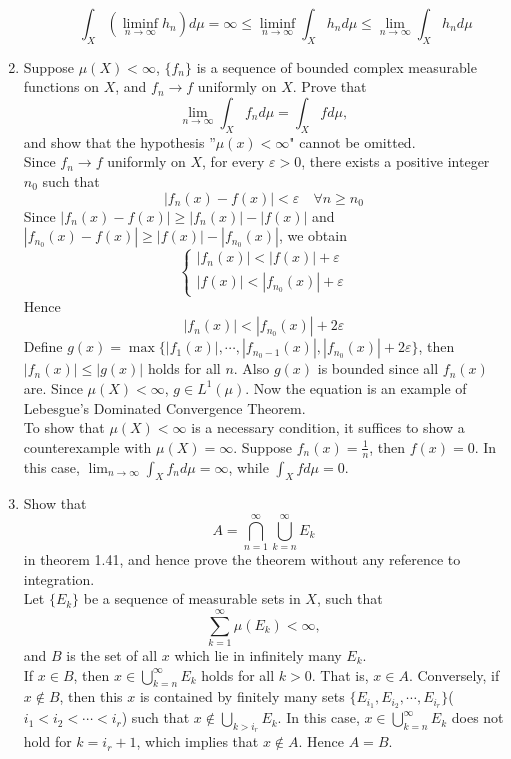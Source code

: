\documentclass{article}
\begin{document}
\begin{enumerate}
\begin{enumerate}
 			\[
 				\int_{X}\left(\liminf_{n\to\infty}h_n\right)d\mu=\infty\leq\liminf_{n\to\infty}\int_{X}h_nd\mu\leq\lim_{n\to\infty}\int_{X}h_nd\mu
 			\]
 	\end{enumerate}
 	\item \exercise Suppose $\mu(X)<\infty$, $\{f_n\}$ is a sequence of bounded complex measurable functions on $X$, and $f_n\to f$ uniformly on $X$. Prove that
 	\[
 		\lim_{n\to\infty}\int_{X}f_nd\mu=\int_{X}fd\mu,
 	\]
 	and show that the hypothesis ''$\mu(x)<\infty$" cannot be omitted.\\
 	\solution
 	Since $f_n\to f$ uniformly on $X$, for every $\varepsilon>0$, there exists a positive integer $n_0$ such that
 	\[
 		|f_n(x)-f(x)|<\varepsilon\quad\forall{n\geq n_0}
 	\]
 	Since $|f_n(x)-f(x)|\geq|f_{n}(x)|-|f(x)|$ and $|f_{n_0}(x)-f(x)|\geq|f(x)|-|f_{n_0}(x)|$, we obtain
 	\[
 		\begin{cases}
 		|f_{n}(x)|<|f(x)|+\varepsilon\\
 		|f(x)|<|f_{n_0}(x)|+\varepsilon
 		\end{cases}
 	\]
 	Hence
 	\[
 		|f_n(x)|<|f_{n_0}(x)|+2\varepsilon
 	\]
 	Define $g(x)=\max\{|f_1(x)|,\cdots,|f_{n_0-1}(x)|,|f_{n_0}(x)|+2\varepsilon\}$, then $|f_n(x)|\leq|g(x)|$ holds for all $n$. Also $g(x)$ is bounded since all $f_n(x)$ are. Since $\mu(X)<\infty$, $g\in{L^1(\mu)}$. Now the equation is an example of Lebesgue's Dominated Convergence Theorem.\\
 	To show that $\mu(X)<\infty$ is a necessary condition, it suffices to show a counterexample with $\mu(X)=\infty$. Suppose $f_n(x)=\frac{1}{n}$, then $f(x)=0$. In this case, $\lim_{n\to\infty}\int_{X}f_nd\mu=\infty$, while $\int_{X}fd\mu=0$.
 	\item \exercise Show that 
 	\[
 		A=\bigcap_{n=1}^{\infty}\bigcup_{k=n}^{\infty}E_k
 	\]
 	in theorem 1.41, and hence prove the theorem without any reference to integration.\\
 	\solution Let $\{E_k\}$ be a sequence of measurable sets in $X$, such that
 	\[
 		\sum_{k=1}^{\infty}\mu(E_k)<\infty,
 	\]
 	and $B$ is the set of all $x$ which lie in infinitely many $E_k$.\\
 	If $x\in{B}$, then $x\in\bigcup_{k=n}^{\infty}E_k$ holds for all $k>0$. That is, $x\in{A}$. Conversely, if $x\notin{B}$, then this $x$ is contained by finitely many sets $\{E_{i_1},E_{i_2},\cdots,E_{i_r}\}$($i_1<i_2<\cdots<i_r$) such that $x\notin\bigcup_{k>i_r}E_{k}$. In this case, $x\in\bigcup_{k=n}^{\infty}E_k$ does not hold for $k=i_r+1$, which implies that $x\notin{A}$. Hence $A=B$.\\

\end{enumerate}
\end{document}
